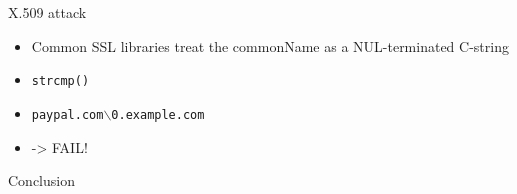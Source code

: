 \documentclass{beamer}
\begin{document}
\begin{frame}{X.509 attack}
  \begin{itemize}
    \item Common SSL libraries treat the commonName as a NUL-terminated C-string
    \item \texttt{strcmp()}
    \item \texttt{paypal.com$\backslash$0.example.com}
    \item -> FAIL!
  \end{itemize}
\end{frame}


\begin{frame}{Conclusion}
\end{frame}
\end{document}
